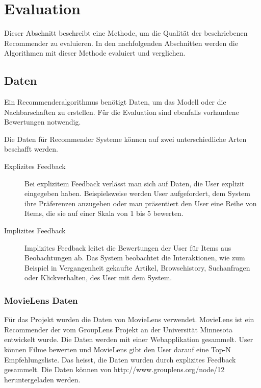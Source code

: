 \documentclass[a4paper, 12pt]{article}
\begin{document}
\section{Evaluation}
\label{sec:evaluation}

Dieser Abschnitt beschreibt eine Methode, um die Qualität der beschriebenen Recommender zu evaluieren. In den nachfolgenden Abschnitten werden die Algorithmen mit dieser Methode evaluiert und verglichen.

\subsection{Daten}
\label{sec:data}

Ein Recommenderalgorithmus benötigt Daten, um das Modell oder die Nachbarschaften zu erstellen. Für die Evaluation sind ebenfalls vorhandene Bewertungen notwendig.

Die Daten für Recommender Systeme können auf zwei unterschiedliche Arten beschafft werden.

\begin{description}
\item[Explizites Feedback] Bei explizitem Feedback verlässt man sich auf Daten, die User explizit eingegeben haben. Beispielsweise werden User aufgefordert, dem System ihre Präferenzen anzugeben oder man präsentiert den User eine Reihe von Items, die sie auf einer Skala von 1 bis 5 bewerten. 
\item[Implizites Feedback] Implizites Feedback leitet die Bewertungen der User für Items aus Beobachtungen ab. Das System beobachtet die Interaktionen, wie zum Beispiel in Vergangenheit gekaufte Artikel, Browsehistory, Suchanfragen oder Klickverhalten, des User mit dem System.
\end{description}

\subsubsection{MovieLens Daten}
\label{sec:movielens}

Für das Projekt wurden die Daten von MovieLens verwendet. MovieLens ist ein Recommender der vom GroupLens Projekt an der Universität Minnesota entwickelt wurde. Die Daten werden mit einer Webapplikation gesammelt. User können Filme bewerten und MovieLens gibt den User darauf eine Top-N Empfehlungsliste. Das heisst, die Daten wurden durch explizites Feedback gesammelt. Die Daten können von http://www.grouplens.org/node/12 heruntergeladen werden. 
\end{document}
